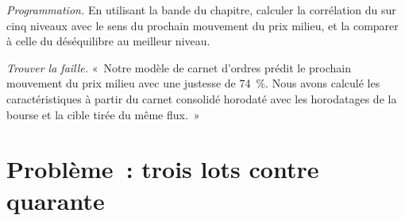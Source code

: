 \begin{exercise}[$\star\star\star$]\label{exo:rs:order-book-features:7}
\emph{Programmation.} En utilisant la bande du chapitre, calculer la corrélation du  sur cinq niveaux avec le sens du
prochain mouvement du prix milieu, et la comparer à celle du déséquilibre au meilleur niveau.
\end{exercise}

\begin{exercise}[$\star\star\star$]\label{exo:rs:order-book-features:8}
\emph{Trouver la faille.} «~Notre modèle de carnet d'ordres prédit le prochain mouvement du prix milieu avec une justesse de 74~\%. Nous avons calculé les caractéristiques à partir du carnet consolidé
horodaté avec les horodatages de la bourse et la cible tirée du même flux.~»
\end{exercise}

\section{Problème~: trois lots contre quarante}

